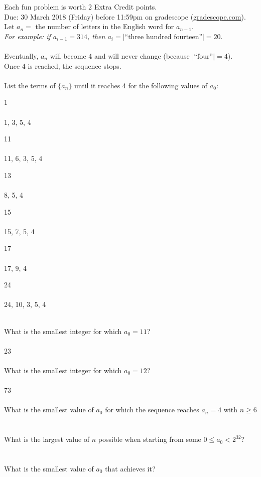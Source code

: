 \documentclass{article}
\theoremstyle{definition}
\newtheorem*{solution}{Solution}
\begin{document}
\noindent
Each fun problem is worth 2 Extra Credit points.\\
Due: 30 March 2018 (Friday) before 11:59pm on gradescope (\url{gradescope.com}).\\

\noindent
Let $a_n =$ the number of letters in the English word for $a_{n-1}$.\\
\textit{For example: if $a_{i-1} = 314$, then $a_i = |\text{``three hundred fourteen''}| = 20$}.\\
\\
Eventually, $a_n$ will become 4 and will never change (because $|\text{``four''}| = 4$).\\
Once 4 is reached, the sequence stops.\\
\\
List the terms of $\{a_n\}$ until it reaches 4 for the following values of $a_0$:

\begin{compactenum}
\item 1\ \\
\ \\
1, 3, 5, 4
\ \\
\item 11\ \\
\ \\
11, 6, 3, 5, 4
\ \\
\item 13\ \\
\ \\
8, 5, 4
\ \\
\item 15\ \\
\ \\
15, 7, 5, 4
\ \\
\item 17\ \\
\ \\
17, 9, 4
\ \\
\item 24\ \\
\ \\
24, 10, 3, 5, 4
\ \\
\end{compactenum}
\ \\
What is the smallest integer for which $a_0 = 11$?\\
\ \\
23
\\ \\
What is the smallest integer for which $a_0 = 12$?\\
\ \\
73
\\ \\
What is the smallest value of $a_0$ for which the sequence reaches $a_n=4$ with $n \geq 6$\\
\ \\

\ \\ 
What is the largest value of $n$ possible when starting from some $0 \leq a_0 < 2^{32}$?\\
\ \\

\ \\
What is the smallest value of $a_0$ that achieves it?
\ \\

\ \\


\end{document}
